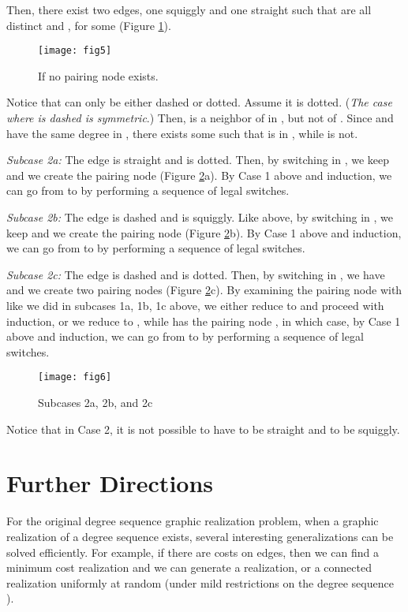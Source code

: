 \documentclass[12pt,a4paper]{article}
\theoremstyle{definition}
\theoremstyle{plain}
\newenvironment{prf}{\noindent {\bf Proof.}}{\begin{flushright}\vspace{-2em}\footnotesize\normalsize\end{flushright}\smallskip}
\begin{document}
\begin{prf}
\noindent Then, there exist two edges, one squiggly  and one straight  such 
that  are all distinct and ,  for some  (Figure \ref{fig5}).
\begin{figure}[h]
\centering
\texttt{[image: fig5]}
\caption{If no pairing node exists.}
\label{fig5}
\end{figure}
Notice that  can only be either dashed or dotted. Assume it is dotted. (\emph{The case 
where  is dashed is symmetric}.) Then,  is a neighbor of  in , but not 
of . Since  and  have the same degree in , there exists some  such that 
 is in , while  is not.

\noindent\emph{Subcase 2a:} The edge  is straight and  is dotted. Then, by 
switching  in , we keep  and we create the pairing node 
 (Figure \ref{fig6}a). By Case 1 above and induction, we can go from  to  by 
performing a sequence of legal switches.

\noindent\emph{Subcase 2b:} The edge  is dashed and  is squiggly. Like above, 
by switching  in , we keep  and we create the pairing 
node  (Figure \ref{fig6}b). By Case 1 above and induction, we can go from  to  by 
performing a sequence of legal switches.

\noindent\emph{Subcase 2c:} The edge  is dashed and  is dotted. Then, by 
switching  in , we have  and we create two pairing nodes 
 (Figure \ref{fig6}c). By examining the pairing node  with  like we did in subcases 1a, 
1b, 1c above, we either reduce  to  and proceed with induction, or we
reduce  to , while  has the pairing node , in which case, by Case 1 
above and induction, we can go from  to  by performing a sequence of legal switches.

\begin{figure}[h]
\centering
\texttt{[image: fig6]}
\caption{Subcases 2a, 2b, and 2c}
\label{fig6}
\end{figure}

Notice that in Case 2, it is not possible to have  to be straight and  to be
squiggly.\\

\end{prf}



\vspace{-3 ex}\section{Further Directions}
\label{sec:discussion}


For the original 
degree sequence graphic realization problem,
when a graphic realization of a degree sequence 
 exists,
several interesting generalizations
can be solved efficiently.
For example, 
if there are costs on edges, then we
can find a minimum cost realization and 
we can generate a realization, or a connected realization 
uniformly at random 
(under mild restrictions on the degree sequence \cite{JS2,ALENEX03,SODAMCMC,FOCS06}).
\end{document}
